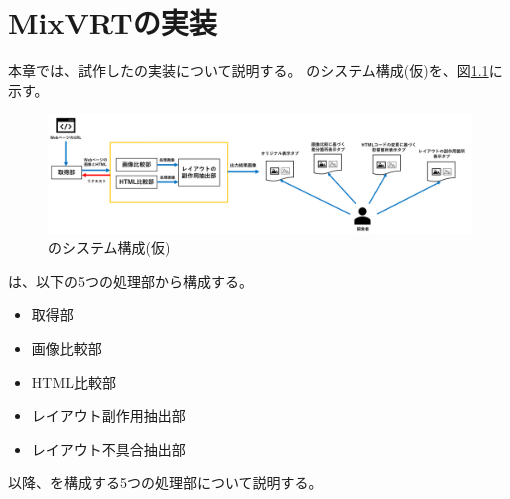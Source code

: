 \chapter{MixVRTの実装}\label{cha:Implementation}
本章では、試作した\toolName の実装について説明する。
\toolName のシステム構成(仮)を、図\ref{fig:System}に示す。
\begin{figure}[tp]
    \begin{center}
        \includegraphics[width=1.0\columnwidth]{image/4_System.png}
        \caption{\toolName のシステム構成(仮)}
        \label{fig:System}
    \end{center}
\end{figure}
\toolName は、以下の5つの処理部から構成する。
\begin{itemize}
    \item 取得部
    \item 画像比較部
    \item HTML比較部
    \item レイアウト副作用抽出部
    \item レイアウト不具合抽出部
\end{itemize}
以降、\toolName を構成する5つの処理部について説明する。
\par

